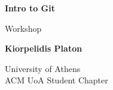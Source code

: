 \begin{titlepage}
	\begin{center}
		\vspace*{1cm}
		\Huge
		\textbf{{\la Intro to Git}}
		
		\vspace{0.5cm}
		\LARGE
		{\sf \la Workshop}

		\vspace{1.5cm}
		\large
		\textbf{\la Kiorpelidis Platon}

		\vfill
		

		\LARGE
		{\sf \la University of Athens}\\
		{\sf \la ACM UoA Student Chapter}
	\end{center}
\end{titlepage}
